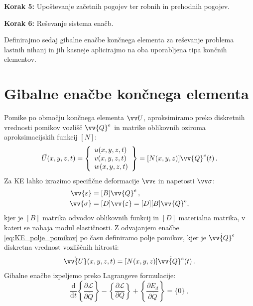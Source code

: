     \textbf{Korak 5:} Upoštevanje začetnih pogojev ter robnih in prehodnih pogojev.

    \textbf{Korak 6:} Reševanje sistema enačb.
    
    Definirajmo sedaj gibalne enačbe končnega elementa za reševanje problema lastnih nihanj in jih kasneje aplicirajmo na oba uporabljena tipa končnih elementov. 

    \newpage
    \section{Gibalne enačbe končnega elementa}
    
        Pomike po območju končnega elementa $\vv U$, aproksimiramo preko diskretnih vrednosti pomikov vozlišč $\vv{Q}^e$ in matrike oblikovnih oziroma aproksimacijskih funkcij $[N]$: 
        \begin{equation}\label{eq:KE_polje_pomikov}
            \vec{U}(x, y, z, t)=\left\{\begin{array}{l}
            u(x, y, z, t) \\
            v(x, y, z, t) \\
            w(x, y, z, t)
            \end{array}\right\}=[N(x, y, z)] \vv{Q}^e(t)\,.
        \end{equation}
        Za KE lahko izrazimo specifične deformacije $\vv \epsilon$ in napetosti $\vv \sigma$:
        \begin{align}
            \vv{\varepsilon}&=[B] \vv{Q}^e \label{eq:KE_deformacije} \,, \\
            \vv{\sigma}&=[D] \vv{\varepsilon}=[D][B] \vv{Q}^e, \label{eq:KE_napetosti}
        \end{align}
        kjer je $[B]$ matrika odvodov oblikovnih funkcij in $[D]$ materialna matrika, v kateri se nahaja modul elastičnosti. Z odvajanjem enačbe \eqref{eq:KE_polje_pomikov} po času definiramo polje pomikov, kjer je $\dot{\vv{Q}^e}$ diskretna vrednost vozliščnih hitrosti:
        \begin{equation}
            \dot{\vv{U}}(x, y, z, t)=[N(x, y, z)] \dot{\vv{Q}^e}(t)\,.
        \end{equation}
        Gibalne enačbe izpeljemo preko Lagrangeve formulacije:
        \begin{equation}\label{eq:KE_Lagrange}
            \frac{\mathrm{d}}{\mathrm{d} t}\left\{\frac{\partial \mathcal{L}}{\partial \dot{Q}}\right\}-\left\{\frac{\partial \mathcal{L}}{\partial Q}\right\}+\left\{\frac{\partial E_d}{\partial \dot{Q}}\right\}=\{0\} \,,
        \end{equation}
